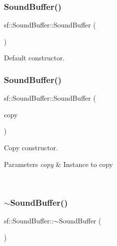 \subsubsection{\texorpdfstring{SoundBuffer()}{SoundBuffer()}\hspace{0.1cm}{\footnotesize\ttfamily [1/2]}}
{\footnotesize\ttfamily sf\+::\+Sound\+Buffer\+::\+Sound\+Buffer (\begin{DoxyParamCaption}{ }\end{DoxyParamCaption})}



Default constructor. 

\begin{DoxyVerb}\end{DoxyVerb}
 \mbox{\label{classsf_1_1_sound_buffer_aaf000fc741ff27015907e8588263f4a6}} 
\subsubsection{\texorpdfstring{SoundBuffer()}{SoundBuffer()}\hspace{0.1cm}{\footnotesize\ttfamily [2/2]}}
{\footnotesize\ttfamily sf\+::\+Sound\+Buffer\+::\+Sound\+Buffer (\begin{DoxyParamCaption}\item[{const \mbox{\hyperlink{classsf_1_1_sound_buffer}{Sound\+Buffer}} \&}]{copy }\end{DoxyParamCaption})}



Copy constructor. 


\begin{DoxyParams}{Parameters}
{\em copy} & Instance to copy \begin{DoxyVerb}\end{DoxyVerb}
 \\
\hline
\end{DoxyParams}
\mbox{\label{classsf_1_1_sound_buffer_aea240161724ffba74a0d6a9e277d3cd5}} 
\subsubsection{\texorpdfstring{$\sim$SoundBuffer()}{~SoundBuffer()}}
{\footnotesize\ttfamily sf\+::\+Sound\+Buffer\+::$\sim$\+Sound\+Buffer (\begin{DoxyParamCaption}{ }\end{DoxyParamCaption})}



